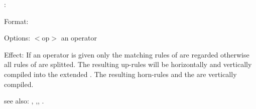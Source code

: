 :

Format: 

Options: $<$op$>$ an operator

Effect: If an operator is given only the matching rules of  are 
	regarded otherwise all rules of  are splitted. The
	resulting up-rules will be horizontally and vertically compiled into the
	extended \WAM{}. The resulting horn-rules and the  are 
	vertically compiled.

see also: , ,, .
